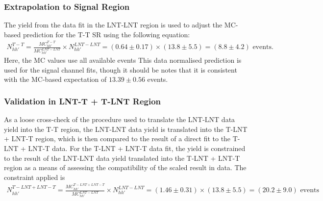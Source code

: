 \subsubsection{Extrapolation to Signal Region}
\label{subsubsec:BhhExtrapolation}

The \Bhh yield from the data fit in the LNT-LNT region is used to adjust the MC-based prediction for the T-T SR using the following equation:
\begin{eqnarray}
  N_{hh'}^{T-T} = \frac{MC_{hh'}^{T-T}}{MC_{hh'}^{LNT-LNT}} \times N_{hh'}^{LNT-LNT}
  = (0.64 \pm 0.17) \times (13.8 \pm 5.5) = (8.8 \pm 4.2) \text{ events}.
  \label{eq:T-T_LNT-LNT_dataBhhYield} 
\end{eqnarray}
Here, the MC values use all available events 
This data normalised prediction is used for the signal channel fits, though it should be notes that it is consistent with the MC-based expectation of $13.39 \pm 0.56$ events. 


\subsubsection{Validation in LNT-T + T-LNT Region}
\label{subsubsec:BhhValidationFits}

As a loose cross-check of the procedure used to translate the LNT-LNT data \Bhh yield into the T-T region, the LNT-LNT data \Bhh yield is translated into the T-LNT + LNT-T region, which is then compared to the result of a direct fit to the T-LNT + LNT-T data. 
For the T-LNT + LNT-T data fit, the \Bhh yield is constrained to the result of the LNT-LNT data \Bhh yield translated into the T-LNT + LNT-T region as a means of assessing the compatibility of the scaled result in data. 
The constraint applied is
\begin{eqnarray}
  N_{hh'}^{T-LNT+LNT-T} = \frac{MC_{hh'}^{T-LNT+LNT-T}}{MC_{hh'}^{LNT-LNT}} \times N_{hh'}^{LNT-LNT}
  = (1.46 \pm 0.31) \times (13.8 \pm 5.5) = (20.2 \pm 9.0) \text{ events} %
  \label{eq:T-LNT-LNT-T_LNT-LNT_dataBhhYield} 
\end{eqnarray}

